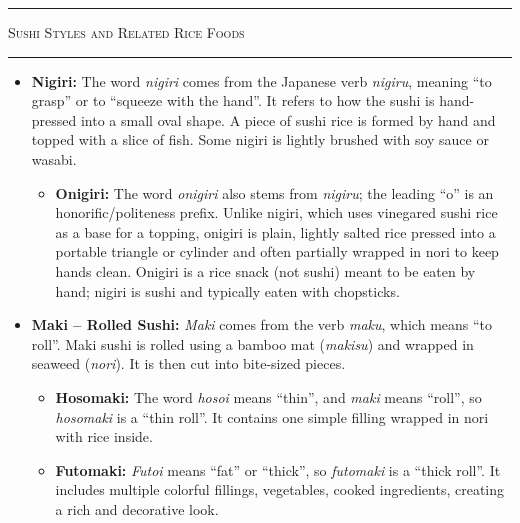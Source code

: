 \documentclass[landscape, a4paper]{article}
\newcommand\alert[1]{\textcolor{PrimaryColor}{\textbf{#1}}}
\begin{document}
\begin{minipage}[t]{0.31\textwidth}
	\vspace{0.5cm}
	\setlength{\parskip}{0.25cm}

	\textcolor{WasabiText}{
		\rule{\linewidth}{0.5mm}
		\vspace{-0.1cm}
		\begin{center}
			\large
			\textsc{Sushi Styles and Related Rice Foods}
		\end{center}
		\rule{\linewidth}{0.5mm}
	}

	\begin{itemize}
		\item \alert{Nigiri:}
		The word \textit{nigiri} comes from the Japanese verb \textit{nigiru}, meaning \enquote{to grasp} or to \enquote{squeeze with the hand}. It refers to how the sushi is hand-pressed into a small oval shape.
		A piece of sushi rice is formed by hand and topped with a slice of fish. Some nigiri is lightly brushed with soy sauce or wasabi.
		\begin{itemize}
			\item \alert{Onigiri:}
			The word \textit{onigiri} also stems from \textit{nigiru}; the leading \enquote{o} is an honorific/politeness prefix. Unlike nigiri, which uses vinegared sushi rice as a base for a topping, onigiri is plain, lightly salted rice pressed into a portable triangle or cylinder and often partially wrapped in nori to keep hands clean. Onigiri is a rice snack (not sushi) meant to be eaten by hand; nigiri is sushi and typically eaten with chopsticks.
		\end{itemize}

		\item \alert{Maki – Rolled Sushi:}
		\textit{Maki} comes from the verb \textit{maku}, which means \enquote{to roll}. Maki sushi is rolled using a bamboo mat (\textit{makisu}) and wrapped in seaweed (\textit{nori}). It is then cut into bite-sized pieces.
		\begin{itemize}
			\item \alert{Hosomaki:}
			The word \textit{hosoi} means \enquote{thin}, and \textit{maki} means \enquote{roll}, so \textit{hosomaki} is a \enquote{thin roll}. It contains one simple filling wrapped in nori with rice inside.

			\item \alert{Futomaki:}
			\textit{Futoi} means \enquote{fat} or \enquote{thick}, so \textit{futomaki} is a \enquote{thick roll}. It includes multiple colorful fillings, vegetables, cooked ingredients, creating a rich and decorative look.
		\end{itemize}


\end{itemize}
\end{minipage}
\end{document}
